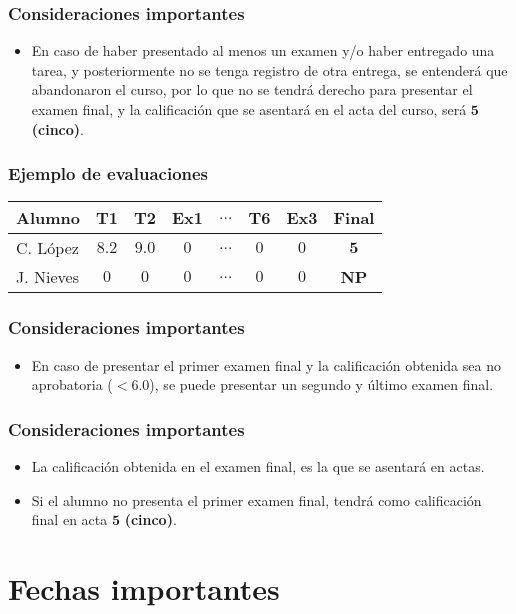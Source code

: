 \documentclass[12pt]{beamer}
\begin{document}
\begin{frame}
\frametitle{Consideraciones importantes}
\begin{itemize}[<+->]
\setlength{\itemsep}{0mm}
\item[\ding{43}] En caso de haber presentado al menos un examen y/o haber entregado una tarea, y posteriormente no se tenga registro de otra entrega, se entenderá que abandonaron el curso, por lo que no se tendrá derecho para presentar el examen final, y la calificación que se asentará en el acta del curso, será $\mathbf{5}$ \textbf{(cinco)}.
\end{itemize}
\end{frame}
\begin{frame}
\frametitle{Ejemplo de evaluaciones}
\fontsize{12}{12}\selectfont
\begin{table}
\begin{tabular}{| l | c | c | c | c | c | c | c |} \hline
Alumno & T1 & T2 & Ex1 &  $\ldots$ &  T6 & Ex3 & Final \\ \hline
C. López & $8.2$ & $9.0$ & $0$ & $\ldots$ & $0$ & $0$ & $\mathbf{5}$ \pause \\ \hline 
J. Nieves & $0$ & $0$ & $0$& $\ldots$ & $0$ & $0$ & \textbf{NP} \\ \hline
\end{tabular}
\end{table}
\end{frame}
\begin{frame}
\frametitle{Consideraciones importantes}
\begin{itemize}[<+->]
\setlength{\itemsep}{0mm}
\item[\ding{48}] En caso de presentar el primer examen final y la calificación obtenida sea no aprobatoria ($<6.0$), se puede presentar un segundo y último examen final.
\end{itemize}
\end{frame}
\begin{frame}
\frametitle{Consideraciones importantes}
\begin{itemize}[<+->]
\setlength{\itemsep}{0mm}
\item[\ding{48}] La calificación obtenida en el examen final, es la que se asentará en actas.
\item[\ding{48}] Si el alumno no presenta el primer examen final, tendrá como calificación final en acta $\mathbf{5}$ \textbf{(cinco)}. 
\end{itemize}
\end{frame}

\section{Fechas importantes}
\end{document}
